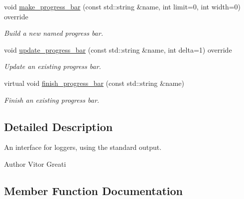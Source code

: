 \begin{DoxyCompactItemize}
\mbox{\label{class_standard_logger_a0330dccddacaff516fd8269aefa814c2}} 
void \mbox{\hyperlink{class_standard_logger_a0330dccddacaff516fd8269aefa814c2}{make\+\_\+progress\+\_\+bar}} (const std\+::string \&name, int limit=0, int width=0) override
\begin{DoxyCompactList}\small\item\em Build a new named progress bar. \end{DoxyCompactList}\item 
\mbox{\label{class_standard_logger_a95d31425aae55e3ee44a433f21112db1}} 
void \mbox{\hyperlink{class_standard_logger_a95d31425aae55e3ee44a433f21112db1}{update\+\_\+progress\+\_\+bar}} (const std\+::string \&name, int delta=1) override
\begin{DoxyCompactList}\small\item\em Update an existing progress bar. \end{DoxyCompactList}\item 
\mbox{\label{class_standard_logger_a121207fba738720a70048cf6c19648ba}} 
virtual void \mbox{\hyperlink{class_standard_logger_a121207fba738720a70048cf6c19648ba}{finish\+\_\+progress\+\_\+bar}} (const std\+::string \&name)
\begin{DoxyCompactList}\small\item\em Finish an existing progress bar. \end{DoxyCompactList}\end{DoxyCompactItemize}


\subsection{Detailed Description}
An interface for loggers, using the standard output. 

\begin{DoxyAuthor}{Author}
Vitor Greati 
\end{DoxyAuthor}


\subsection{Member Function Documentation}
\mbox{\label{class_standard_logger_a5803969715008363869dfd47326790bb}} 
